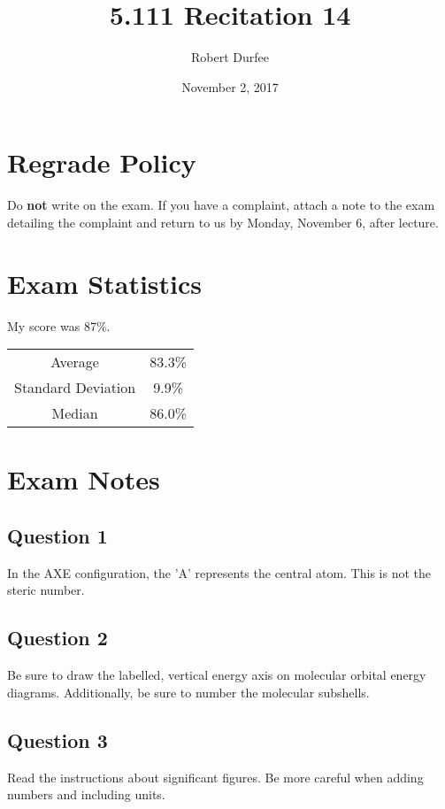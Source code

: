 \documentclass{article}
\title{5.111 Recitation 14}
\author{Robert Durfee}
\date{November 2, 2017}
\begin{document}
\maketitle

\section{Regrade Policy}

Do \textbf{not} write on the exam. If you have a complaint, attach a note to the
exam detailing the complaint and return to us by Monday, November 6, after
lecture.

\section{Exam Statistics}

My score was 87\%.

\begin{center}
\begin{tabular}{c c}
    Average & 83.3\% \\
    Standard Deviation & 9.9\% \\
    Median & 86.0\%
\end{tabular}
\end{center}

\section{Exam Notes}

\subsection*{Question 1}

In the AXE configuration, the 'A' represents the central atom. This is not the
steric number.

\subsection*{Question 2}

Be sure to draw the labelled, vertical energy axis on molecular orbital energy
diagrams. Additionally, be sure to number the molecular subshells.

\subsection*{Question 3}

Read the instructions about significant figures. Be more careful when adding
numbers and including units.
\end{document}
